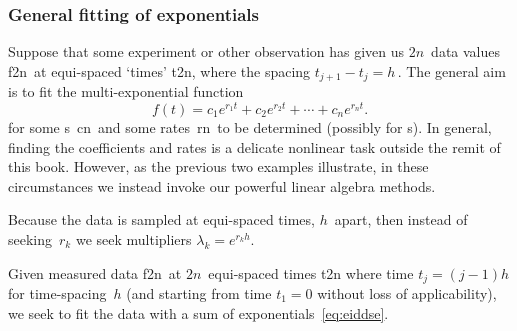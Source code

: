 \begin{reduce}
\subsubsection{General fitting of exponentials}

Suppose that some experiment or other observation has given us \(2n\)~data values \hlist f{2n}\ at equi-spaced `times' \hlist t{2n}, where the spacing \(t_{j+1}-t_j=h\)\,.
The general aim is to fit the multi-exponential function \cite[\S2.6, e.g.]{Cuyt2015}
\begin{equation}
f(t)=c_1e^{r_1t}+c_2e^{r_2t}+\cdots+c_ne^{r_nt}.
\label{eq:eiddse}
\end{equation}
for some s~\hlist cn\ and some rates~\hlist rn\ to be determined (possibly  for s).
In general, finding the coefficients and rates is a delicate nonlinear task outside the remit of this book.
However, as the previous two examples illustrate, in these circumstances we instead invoke our powerful linear algebra methods.

Because the data is sampled at equi-spaced times, \(h\)~apart, then instead of seeking~\(r_k\) we seek multipliers \(\lambda_k=e^{r_kh}\).

\begin{procedure} \label{pro:ei}
Given measured data \hlist f{2n}\ at \(2n\)~equi-spaced times \hlist t{2n} where time \(t_j=(j-1)h\) for time-spacing~\(h\) (and starting from time \(t_1=0\) without loss of applicability), we seek to fit the data with a sum of exponentials~\eqref{eq:eiddse}.
\end{procedure}
\end{reduce}
